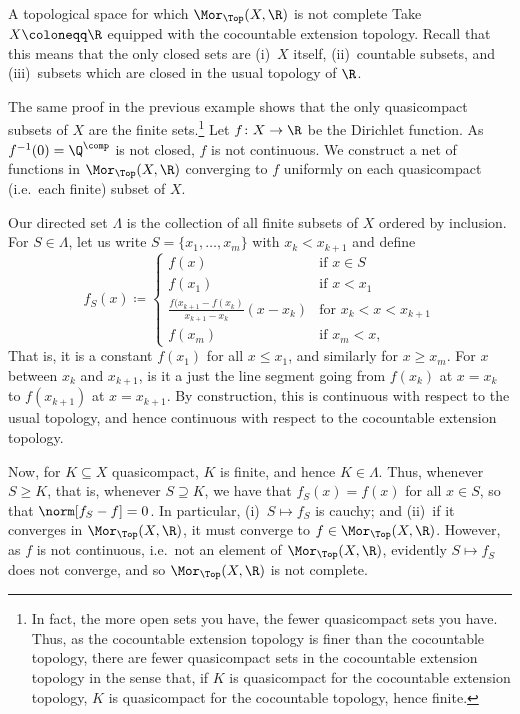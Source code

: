 \begin{exm}{A topological space for which $\Mor _{\Top}(X,\R )$ is not complete}{}
Take $X\coloneqq \R$ equipped with the cocountable extension topology.  Recall that this means that the only closed sets are (i)~$X$ itself, (ii)~countable subsets, and (iii)~subsets which are closed in the usual topology of $\R$.

The same proof in the previous example shows that the only quasicompact subsets of $X$ are the finite sets.\footnote{In fact, the more open sets you have, the fewer quasicompact sets you have.  Thus, as the cocountable extension topology is finer than the cocountable topology, there are fewer quasicompact sets in the cocountable extension topology in the sense that, if $K$ is quasicompact for the cocountable extension topology, $K$ is quasicompact for the cocountable topology, hence finite.}  Let $f\colon X\rightarrow \R$ be the Dirichlet function.  As $f^{-1}(0)=\Q ^{\comp}$ is not closed, $f$ is not continuous.  We construct a net of functions in $\Mor _{\Top}(X,\R )$ converging to $f$ uniformly on each quasicompact (i.e.~each finite) subset of $X$.

Our directed set $\Lambda$ is the collection of all finite subsets of $X$ ordered by inclusion.  For $S\in \Lambda$, let us write $S=\{ x_1,\ldots ,x_m\}$ with $x_k<x_{k+1}$ and define
\begin{equation}
f_S(x)\coloneqq \begin{cases}f(x) & \text{if }x\in S \\ f(x_1) & \text{if }x<x_1 \\ \frac{f(x_{k+1}-f(x_k)}{x_{k+1}-x_k}(x-x_k) & \text{for }x_k<x<x_{k+1} \\ f(x_m) & \text{if }x_m<x,\end{cases}
\end{equation}
That is, it is a constant $f(x_1)$ for all $x\leq x_1$, and similarly for $x\geq x_m$.  For $x$ between $x_k$ and $x_{k+1}$, is it a just the line segment going from $f(x_k)$ at $x=x_k$ to $f(x_{k+1})$ at $x=x_{k+1}$.  By construction, this is continuous with respect to the usual topology, and hence continuous with respect to the cocountable extension topology.

Now, for $K\subseteq X$ quasicompact, $K$ is finite, and hence $K\in \Lambda$.  Thus, whenever $S\geq K$, that is, whenever $S\supseteq K$, we have that $f_S(x)=f(x)$ for all $x\in S$, so that $\norm[f_S-f]=0$.  In particular, (i)~$S\mapsto f_S$ is cauchy; and (ii)~if it converges in $\Mor _{\Top}(X,\R )$, it must converge to $f\in \Mor _{\Top}(X,\R )$.  However, as $f$ is not continuous, i.e.~not an element of $\Mor _{\Top}(X,\R )$, evidently $S\mapsto f_S$ does not converge, and so $\Mor _{\Top}(X,\R )$ is not complete.
\end{exm}
